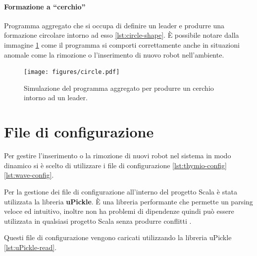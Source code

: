\documentclass[12pt,a4paper,openright,twoside]{book}
\begin{document}
\paragraph{Formazione a ``cerchio''}

Programma aggregato che si occupa di definire un leader e produrre una formazione circolare intorno ad esso \cref{lst:circle-shape}. È possibile notare dalla immagine \cref{fig:circle-formation} come il programma si comporti correttamente anche in situazioni anomale come la rimozione o l'inserimento di nuovo robot nell'ambiente.



\begin{figure}
    \centering
    \texttt{[image: figures/circle.pdf]}
    \caption{Simulazione del programma aggregato per produrre un cerchio intorno ad un leader.}
    \label{fig:circle-formation}
\end{figure}

\section{File di configurazione}

Per gestire l'inserimento o la rimozione di nuovi robot nel sistema in modo dinamico si è scelto di utilizzare i file di configurazione \cref{lst:thymio-config} \cref{lst:wave-config}.

Per la gestione dei file di configurazione all'interno del progetto Scala è stata utilizzata la libreria \textbf{uPickle}. È una libreria performante che permette un parsing veloce ed intuitivo, inoltre non ha problemi di dipendenze quindi può essere utilizzata in qualsiasi progetto Scala senza produrre conflitti \cite{uPickle}.





Questi file di configurazione vengono caricati utilizzando la libreria uPickle \cite{uPickle} \cref{lst:uPickle-read}.


\end{document}
